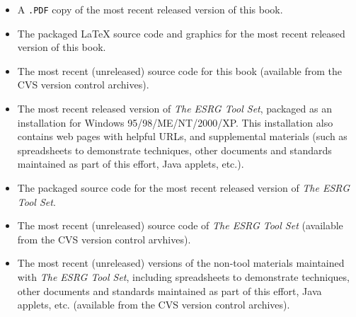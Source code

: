 \begin{itemize} 
\item A \texttt{.PDF} copy of the most recent released
      version of this book.

\item The packaged \LaTeX{} source code and graphics
      for the most recent released
      version of this book.

\item The most recent (unreleased) source code for this book
      (available from the CVS version control archives).

\item The most recent released version of 
      \emph{The ESRG Tool Set}, packaged as an installation
      for Windows 95/98/ME/NT/2000/XP.  This installation also
	  contains web pages with helpful URLs, and supplemental
	  materials (such as spreadsheets to demonstrate techniques,
	  other documents and standards maintained as part of this
	  effort,
	  Java applets, etc.).

\item The packaged source code for the most recent released
      version of \emph{The ESRG Tool Set}.

\item The most recent (unreleased) source code of
      \emph{The ESRG Tool Set} (available from the CVS
      version control arvhives).

\item The most recent (unreleased) versions of the non-tool
      materials maintained with \emph{The ESRG Tool Set}, including
	  spreadsheets to demonstrate techniques, other
      documents and standards maintained as part of this
	  effort, Java applets, etc. (available from the CVS version control
	  archives).
\end{itemize} 


